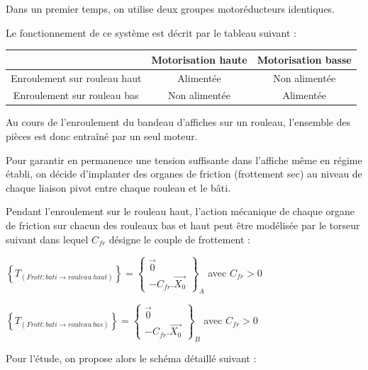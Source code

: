 Dans un premier temps, on utilise deux groupes motoréducteurs identiques.

Le fonctionnement de ce système est décrit par le tableau suivant :

\begin{center}
\begin{table}[!h]
\begin{tabular}{|c|c|c|}
\hline
& Motorisation haute	& Motorisation basse \\
\hline
Enroulement sur rouleau haut	 & Alimentée & Non alimentée \\
\hline
Enroulement sur rouleau bas & Non alimentée & Alimentée \\
\hline
\end{tabular}
\end{table}
\end{center}

Au cours de l'enroulement du bandeau d'affiches sur un rouleau, l'ensemble des pièces est donc entraîné par un seul moteur. 

Pour garantir en permanence une tension suffisante dans l'affiche même en régime établi, on décide d'implanter des organes de friction (frottement sec) au niveau de chaque liaison pivot entre chaque rouleau et le bâti.

Pendant l'enroulement sur le rouleau haut, l'action mécanique de chaque organe de friction sur chacun des rouleaux bas et haut peut être modélisée par le torseur suivant dans lequel $C_{fr}$ désigne le couple de frottement :

$\left\{T_{(Frott:bati\rightarrow rouleau\ haut)}\right\}=\left\{\begin{array}{c}
\overrightarrow{0} \\ -C_{fr}.\overrightarrow{X_0}\end{array}\right\}_A$ avec $C_{fr}>0$

$\left\{T_{(Frott:bati\rightarrow rouleau\ bas)}\right\}=\left\{\begin{array}{c}
\overrightarrow{0} \\ -C_{fr}.\overrightarrow{X_0}\end{array}\right\}_B$ avec $C_{fr}>0$

Pour l'étude, on propose alors le schéma détaillé suivant :
 
